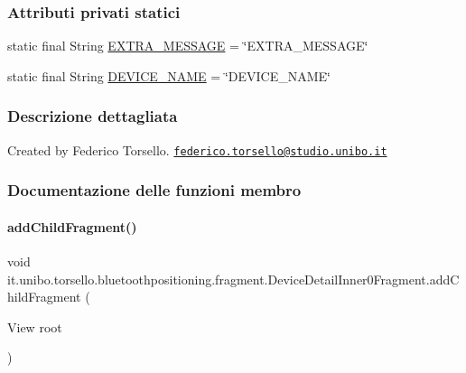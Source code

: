 \subsubsection*{Attributi privati statici}
\begin{DoxyCompactItemize}
\item 
static final String \hyperlink{classit_1_1unibo_1_1torsello_1_1bluetoothpositioning_1_1fragment_1_1DeviceDetailInner0Fragment_aa3b3a2d88a7d6c614f87cdb6cee5c4b8_aa3b3a2d88a7d6c614f87cdb6cee5c4b8}{E\+X\+T\+R\+A\+\_\+\+M\+E\+S\+S\+A\+GE} = \char`\"{}E\+X\+T\+R\+A\+\_\+\+M\+E\+S\+S\+A\+GE\char`\"{}
\item 
static final String \hyperlink{classit_1_1unibo_1_1torsello_1_1bluetoothpositioning_1_1fragment_1_1DeviceDetailInner0Fragment_ab2957d43ea532c398e82aceec148fc06_ab2957d43ea532c398e82aceec148fc06}{D\+E\+V\+I\+C\+E\+\_\+\+N\+A\+ME} = \char`\"{}D\+E\+V\+I\+C\+E\+\_\+\+N\+A\+ME\char`\"{}
\end{DoxyCompactItemize}


\subsubsection{Descrizione dettagliata}
Created by Federico Torsello. \href{mailto:federico.torsello@studio.unibo.it}{\tt federico.\+torsello@studio.\+unibo.\+it} 

\subsubsection{Documentazione delle funzioni membro}
\hypertarget{classit_1_1unibo_1_1torsello_1_1bluetoothpositioning_1_1fragment_1_1DeviceDetailInner0Fragment_af00be470ccce3ed7d2f1831ef7dbf307_af00be470ccce3ed7d2f1831ef7dbf307}{}\label{classit_1_1unibo_1_1torsello_1_1bluetoothpositioning_1_1fragment_1_1DeviceDetailInner0Fragment_af00be470ccce3ed7d2f1831ef7dbf307_af00be470ccce3ed7d2f1831ef7dbf307} 
\paragraph{\texorpdfstring{add\+Child\+Fragment()}{addChildFragment()}}
{\footnotesize\ttfamily void it.\+unibo.\+torsello.\+bluetoothpositioning.\+fragment.\+Device\+Detail\+Inner0\+Fragment.\+add\+Child\+Fragment (\begin{DoxyParamCaption}\item[{View}]{root }\end{DoxyParamCaption})\hspace{0.3cm}{\ttfamily [private]}}


